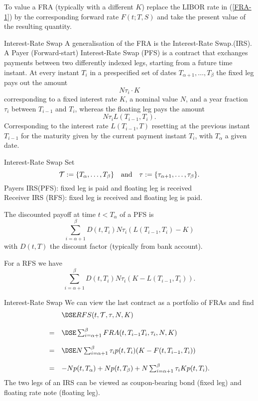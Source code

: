 	To value a FRA (typically with a different $K$) replace the LIBOR rate in (\ref{FRA-1}) by
	the corresponding forward rate $F(t;T,S)$ and take the present value of the resulting quantity.



Interest-Rate Swap
	A generalisation
	of the FRA is the Interest-Rate Swap.(IRS). A Payer (Forward-start)
	Interest-Rate Swap (PFS) is a contract that exchanges payments
	between two differently indexed legs, starting from a future time
	instant. At every instant $T_i$ in a prespecified set of dates
	$T_{\alpha+1},\ldots ,T_{\beta}$ the fixed leg pays out the amount
		$$
		N\tau_i\cdot K
		$$
	corresponding to a fixed interest rate $K$, a
	nominal value $N$, and a year fraction $\tau_i$ between $T_{i-1}$
	and $T_i$, whereas the floating leg pays the amount
		$$
		N\tau_i L(T_{i-1},T_i).
		$$
	Corresponding to the interest rate
	$L(T_{i-1},T)$ resetting at the previous instant $T_{i-1}$ for the
	maturity given by the current payment instant $T_i$, with
	$T_{\alpha}$ a given date.

Interest-Rate Swap
	Set
		$${\cal T}:=\{T_{\alpha},\ldots ,T_{\beta}\}\quad\mbox{and}\quad
		\tau:=\{\tau_{\alpha+1},\ldots,\tau_{\beta}\}.
		$$
	Payers IRS(PFS):
	fixed leg is paid and floating leg is received \\
	Receiver IRS (RFS): fixed leg is received and floating leg is
	paid.

	The discounted payoff at time $t<T_{\alpha}$ of a PFS is
		$$
		\sum_{i=\alpha+1}^{\beta}D(t,T_i)N\tau_i(L(T_{i-1},T_i)-K)
		$$
	with $D(t,T)$ the discount factor (typically from bank account).

	For a RFS we have
		$$
		\sum_{i=\alpha+1}^{\beta}D(t,T_i)N\tau_i(K-L(T_{i-1},T_i)).
		$$


Interest-Rate Swap
	We can view the last contract as a portfolio of FRAs and find
		$$
		\begin{array}{ll}
		& \DSE RFS(t,{\cal T},\tau,N,K) \\*[12pt] = & \DSE \sum_{i=\alpha+1}^{\beta}FRA(t,T_{i-1}T_i,\tau_i,N,K) \\*[12pt]
		= & \DSE N\sum_{i=\alpha+1}^{\beta}\tau_i p(t,T_i)(K-F(t,T_{i-1},T_i))\\*[12pt]
		= & -N   p(t,T_{\alpha})+Np(t,T_{\beta})+N\sum_{i=\alpha+1}^{\beta}\tau_i Kp(t,T_i).
		\end{array}
		$$
	The two legs of an IRS can be viewed as
	coupon-bearing bond (fixed leg) and floating rate note (floating leg).


